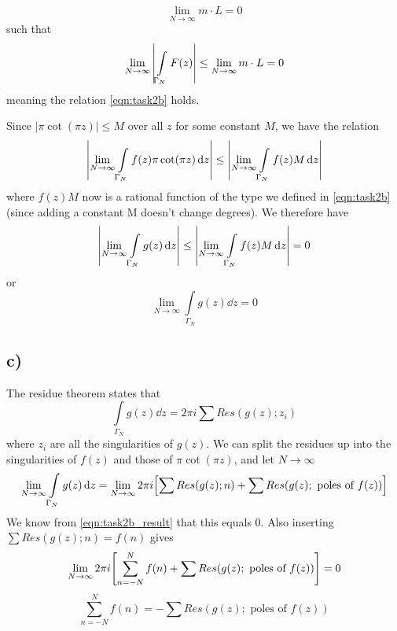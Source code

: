 \documentclass[10pt,a4paper]{article}
\newcommand{\limN}{\lim_{N\rightarrow \infty}}
\newcommand{\Gammaint}{\int\limits_{\Gamma_N}}
\begin{document}
\begin{equation}
    \limN m\cdot L = 0
\end{equation}
such that
\begin{equation}
    \limN \qty| \Gammaint F(z)| \leq \limN m\cdot L = 0
\end{equation}
meaning the relation \ref{eqn:task2b} holds.

Since $|\pi\cot(\pi z)| \leq M$ over all $z$ for some constant $M$, we have the relation
\begin{equation}
    \qty|\limN \Gammaint f(z) \pi\cot(\pi z) \dd{z}| \leq \qty|\limN \Gammaint f(z) M \dd{z}|
\end{equation}
where $f(z)M$ now is a rational function of the type we defined in \ref{eqn:task2b} (since adding a constant M doesn't change degrees). We therefore have
\begin{equation}
    \qty|\limN \Gammaint g(z)\dd{z}| \leq \qty|\limN \Gammaint f(z) M \dd{z}| = 0
\end{equation}
or
\begin{equation}\label{eqn:task2b_result}
    \limN \Gammaint g(z)\dd{z} = 0
\end{equation}


\subsection*{c)}
The residue theorem states that
\begin{equation}
    \Gammaint g(z) \dd{z} = 2\pi i \sum Res(g(z); z_i)
\end{equation}
where $z_i$ are all the singularities of $g(z)$. We can split the residues up into the singularities of $f(z)$ and those of $\pi \cot(\pi z)$, and let $N\rightarrow \infty$
\begin{equation}
    \limN \Gammaint g(z) \dd{z} = \limN 2\pi i \qty[ \sum Res(g(z); n) + \sum Res(g(z); \text{ poles of } f(z)) ]
\end{equation}
We know from \ref{eqn:task2b_result} that this equals 0. Also inserting $\sum Res(g(z); n) = f(n)$ gives
\begin{equation}
    \limN 2\pi i \qty[\sum_{n=-N}^{N} f(n) + \sum Res(g(z); \text{ poles of } f(z))] = 0
\end{equation}
\begin{equation}\label{eqn:task2c}
    \sum_{n=-N}^{N} f(n) = - \sum Res(g(z); \text{ poles of } f(z))
\end{equation}
\end{document}
